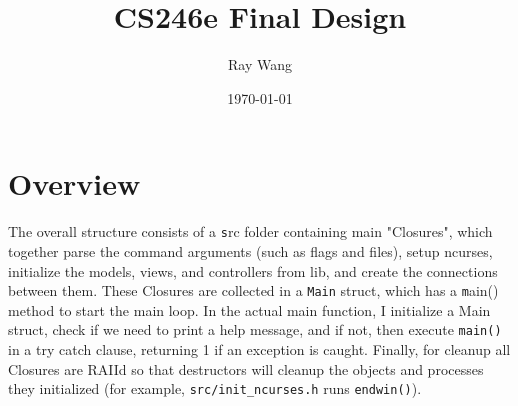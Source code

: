 \documentclass{article}
\title{CS246e Final Design}
\author{Ray Wang}
\date{\today}
\begin{document}
\section{Overview}
\quad The overall structure consists of a {\texttt src} folder containing main "Closures",
which together parse the command arguments (such as flags and files), 
setup ncurses, 
initialize the models, views, and controllers from lib, 
and create the connections between them.
These Closures are collected in a \texttt{Main} struct, 
which has a {\texttt main()} method to start the main loop.
In the actual main function, I 
initialize a Main struct, 
check if we need to print a help message, and if not, 
then execute \texttt{main()} in a try catch clause, returning 1 if an exception is caught.
Finally, for cleanup all Closures are RAIId so that 
destructors will cleanup the objects and processes they initialized 
(for example, \texttt{src/init\_ncurses.h} runs \texttt{endwin()}).
\end{document}
